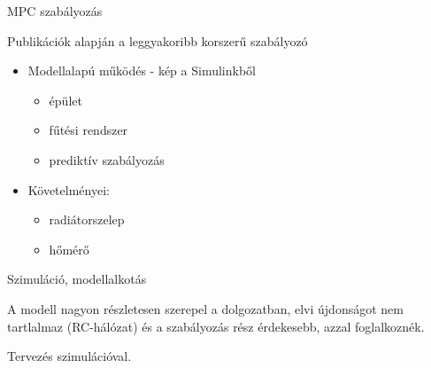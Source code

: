 \documentclass[14pt,handout]{beamer}
\begin{document}
\begin{frame}{MPC szabályozás}

Publikációk alapján a leggyakoribb korszerű szabályozó

\begin{itemize}
	\setlength{\itemsep}{12pt}
	\item Modellalapú működés - kép a Simulinkből
	\begin{itemize}
		\item épület
		\item fűtési rendszer
		\item prediktív szabályozás
	\end{itemize}
	\item Követelményei:
	\begin{itemize}
		\item radiátorszelep
		\item hőmérő
	\end{itemize}
\end{itemize}
\end{frame}



\begin{frame}{Szimuláció, modellalkotás}

A modell nagyon részletesen szerepel a dolgozatban, elvi újdonságot nem tartlalmaz (RC-hálózat) és a szabályozás rész érdekesebb, azzal foglalkoznék.

Tervezés szimulációval.



\end{frame}
\end{document}
